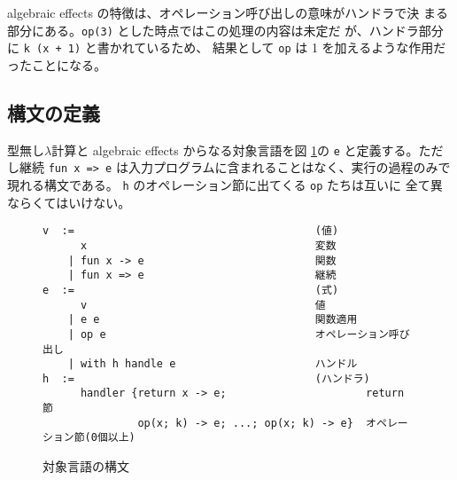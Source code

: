 algebraic effects の特徴は、オペレーション呼び出しの意味がハンドラで決
まる部分にある。\texttt{op(3)} とした時点ではこの処理の内容は未定だ
が、ハンドラ部分に \texttt{k (x + 1)} と書かれているため、
結果として \texttt{op} は 1 を加えるような作用だったことになる。

\subsection{構文の定義}
\label{subsection:syntax}
型無し$\lambda$計算と algebraic effects からなる対象言語を図 \ref{figure:abstract_syntax}の \texttt{e} と定義する。ただし継続 \texttt{fun x => e} は入力プログラムに含まれることはなく、実行の過程のみで現れる構文である。
\texttt{h} のオペレーション節に出てくる \texttt{op} たちは互いに
全て異ならくてはいけない。


\begin{figure}
\begin{verbatim}
v  :=                                      (値)
      x                                    変数
    | fun x -> e                           関数
    | fun x => e                           継続
e  :=                                      (式)
      v                                    値
    | e e                                  関数適用
    | op e                                 オペレーション呼び出し
    | with h handle e                      ハンドル
h  :=                                      (ハンドラ)
      handler {return x -> e;                      return 節
               op(x; k) -> e; ...; op(x; k) -> e}  オペレーション節(0個以上)
\end{verbatim}
\caption{対象言語の構文}
\label{figure:abstract_syntax}
\end{figure}


